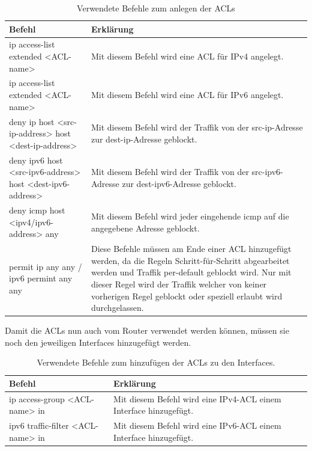 \documentclass{article}
\begin{document}
\begin{table}[htbp]
    \centering
    \begin{tabularx}{\textwidth}{|X|X|}
        \toprule
        \textbf{Befehl} & \textbf{Erklärung} \\
        \midrule
        ip access-list extended <ACL-name> & Mit diesem Befehl wird eine ACL für IPv4 angelegt.\\
        \hline
        ip access-list extended <ACL-name> & Mit diesem Befehl wird eine ACL für IPv6 angelegt.\\
        \hline
        deny ip host <src-ip-address> host <dest-ip-address> & Mit diesem Befehl wird der Traffik von der src-ip-Adresse zur dest-ip-Adresse geblockt.\\ 
        \hline
        deny ipv6 host <src-ipv6-address> host <dest-ipv6-address> & Mit diesem Befehl wird der Traffik von der src-ipv6-Adresse zur dest-ipv6-Adresse geblockt.\\
        \hline
        deny icmp host <ipv4/ipv6-address> any & Mit diesem Befehl wird jeder eingehende icmp auf die angegebene Adresse geblockt.\\
        \hline
        permit ip any any / ipv6 permint any any & Diese Befehle müssen am Ende einer ACL hinzugefügt werden, da die Regeln Schritt-für-Schritt abgearbeitet werden und Traffik per-default geblockt wird. Nur mit dieser Regel wird der Traffik welcher von keiner vorherigen Regel geblockt oder speziell erlaubt wird durchgelassen.\\ 
        \bottomrule
    \end{tabularx}
    \caption{Verwendete Befehle zum anlegen der ACLs}
    \label{tab:commands}
\end{table}

\noindent Damit die ACLs nun auch vom Router verwendet werden können, müssen sie noch den jeweiligen Interfaces hinzugefügt werden.\\

\begin{table}[htbp]
    \centering
    \begin{tabularx}{\textwidth}{|X|X|}
        \toprule
        \textbf{Befehl} & \textbf{Erklärung} \\
        \midrule
        ip access-group <ACL-name> in & Mit diesem Befehl wird eine IPv4-ACL einem Interface hinzugefügt.\\
        \hline
        ipv6 traffic-filter <ACL-name> in & Mit diesem Befehl wird eine IPv6-ACL einem Interface hinzugefügt.\\
        \bottomrule
    \end{tabularx}
    \caption{Verwendete Befehle zum hinzufügen der ACLs zu den Interfaces.}
    \label{tab:commands}
\end{table}
\end{document}
